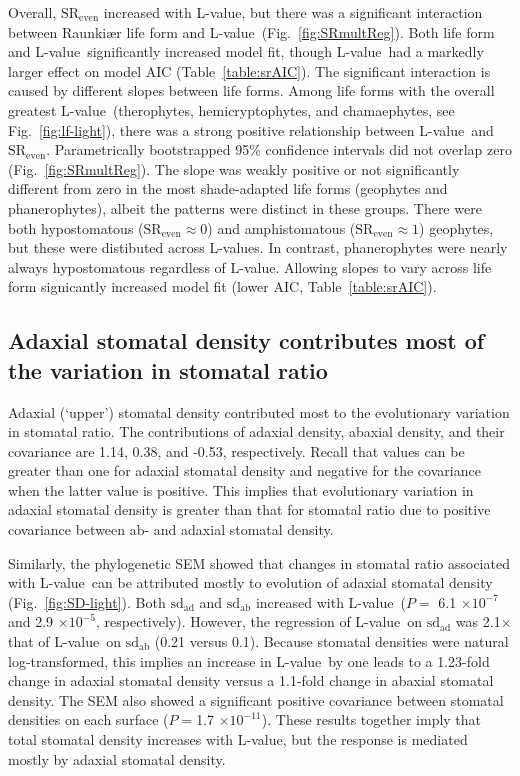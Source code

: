 \documentclass[12pt, oneside]{article}
\newcommand{\el}{L-value}
\begin{document}
Overall, $\mathrm{SR_{even}}$ increased with \el, but there was a significant interaction between Raunki\ae r life form and \el~(Fig.~\ref{fig:SRmultReg}). Both life form and \el~significantly increased model fit, though \el~had a markedly larger effect on model AIC (Table~\ref{table:srAIC}). The significant interaction is caused by different slopes between life forms. Among life forms with the overall greatest \el~(therophytes, hemicryptophytes, and chamaephytes, see Fig.~\ref{fig:lf-light}), there was a strong positive relationship between \el~and $\mathrm{SR_{even}}$. Parametrically bootstrapped 95\% confidence intervals did not overlap zero (Fig.~\ref{fig:SRmultReg}). The slope was weakly positive or not significantly different from zero in the most shade-adapted life forms (geophytes and phanerophytes), albeit the patterns were distinct in these groups. There were both hypostomatous ($\mathrm{SR_{even}} \approx 0$) and amphistomatous ($\mathrm{SR_{even}} \approx 1$) geophytes, but these were distibuted across \el s. In contrast, phanerophytes were nearly always hypostomatous regardless of \el. Allowing slopes to vary across life form signicantly increased model fit (lower AIC, Table~\ref{table:srAIC}).

\subsection*{Adaxial stomatal density contributes most of the variation in stomatal ratio}

Adaxial (`upper') stomatal density contributed most to the evolutionary variation in stomatal ratio. The contributions of adaxial density, abaxial density, and their covariance are 1.14, 0.38, and -0.53, respectively. Recall that values can be greater than one for adaxial stomatal density and negative for the covariance when the latter value is positive. This implies that evolutionary variation in adaxial stomatal density is greater than that for stomatal ratio due to positive covariance between ab- and adaxial stomatal density.

Similarly, the phylogenetic SEM showed that changes in stomatal ratio associated with \el~can be attributed mostly to evolution of adaxial stomatal density (Fig.~\ref{fig:SD-light}). Both $\mathrm{sd_{ad}}$ and $\mathrm{sd_{ab}}$ increased with \el~($P =$ 6.1 $\times10^{-7}$ and 2.9 $\times10^{-5}$, respectively). However, the regression of \el~on $\mathrm{sd_{ad}}$ was 2.1$\times$ that of \el~on $\mathrm{sd_{ab}}$ (0.21 versus 0.1). Because stomatal densities were natural log-transformed, this implies an increase in \el~by one leads to a 1.23-fold change in adaxial stomatal density versus a 1.1-fold change in abaxial stomatal density. The SEM also showed a significant positive covariance between stomatal densities on each surface ($P = $1.7 $\times10^{-11}$). These results together imply that total stomatal density increases with \el, but the response is mediated mostly by adaxial stomatal density.
\end{document}
